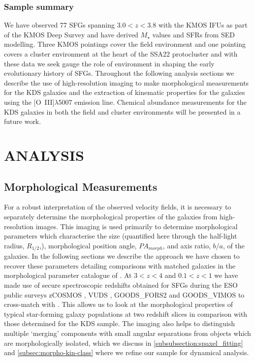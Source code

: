 \documentclass[fleqn,usenatbib]{mn2e}
\begin{document}
\subsubsection{Sample summary}\label{subsubsec:sample_summary}
We have observed 77 SFGs spanning $3.0 < z < 3.8$ with the KMOS IFUs as part of the KMOS Deep Survey and have derived $M_{\star}$ values and SFRs from SED modelling.
Three KMOS pointings cover the field environment and one pointing covers a cluster environment at the heart of the SSA22 protocluster and with these data we seek gauge the role of environment in shaping the early evolutionary history of SFGs.
Throughout the following analysis sections we describe the use of high-resolution imaging to make morphological measurements for the KDS galaxies and the extraction of kinematic properties for the galaxies using the [O~{\sc III}]$\lambda$5007 emission line.
Chemical abundance measurements for the KDS galaxies in both the field and cluster environments will be presented in a future work.

\section{ANALYSIS}\label{sec:analysis}


\subsection{Morphological Measurements}\label{subsec:morphological_measurements}
For a robust interpretation of the observed velocity fields, it is necessary to separately determine the morphological properties of the galaxies from high-resolution images.
This imaging is used primarily to determine morphological parameters which characterise the size (quantified here through the half-light radius, $R_{1/2}$,), morphological position angle, $PA_{morph}$, and axis ratio, $b/a$, of the galaxies. 
In the following sections we describe the approach we have chosen to recover these parameters detailing comparisons with matched galaxies in the morphological parameter catalogue of \cite{VanderWel2012}.
At $3 < z < 4$ and $0.1 < z < 1$ we have made use of secure spectroscopic redshifts obtained for SFGs during the ESO public surveys zCOSMOS \citep{Lilly2007}, VUDS \citep{Tasca2016}, GOODS\_FORS2 \citep{Vanzella2005,Vanzella2006,Vanzella2008} and GOODS\_VIMOS \citep{Balestra2010} to cross-match with \cite{VanderWel2012}.
This allows us to look at the morphological properties of typical star-forming galaxy populations at two redshift slices in comparison with those determined for the KDS sample.
The imaging also helps to distinguish multiple `merging' components with small angular separations from objects which are morphologically isolated, which we discuss in \cref{subsubsection:spaxel_fitting} and \cref{subsec:morpho-kin-class} where we refine our sample for dynamical analysis.
\end{document}
